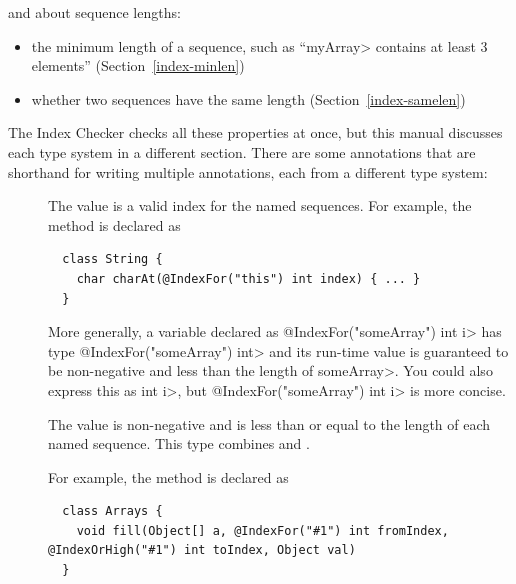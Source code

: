 \noindent
and about sequence lengths:
\begin{itemize}
\item
  the minimum length of a sequence, such as ``\<myArray> contains at least 3
  elements'' (Section~\ref{index-minlen})
\item
  whether two sequences have the same length (Section~\ref{index-samelen})
\end{itemize}

The Index Checker checks all these properties at once, but
this manual discusses each type system in a different section.
There are some annotations that are shorthand for writing multiple
annotations, each from a different type system:

\begin{description}
\item[]
  The value is a valid index for the named sequences.  For example, the
  method is declared as

  \begin{Verbatim}
  class String {
    char charAt(@IndexFor("this") int index) { ... }
  }
  \end{Verbatim}

  More generally, a variable
  declared as \<@IndexFor("someArray") int i> has type
  \<@IndexFor("someArray") int> and its run-time value is guaranteed to be
  non-negative and less than the length of \<someArray>.  You could also
  express this as
  \<
  int i>,
  but \<@IndexFor("someArray") int i> is more concise.

 \item[]
   The value is non-negative and is less than or equal to the length of
   each named sequence.  This type combines
   and
  .

  For example, the
   method is declared as

  \begin{mysmall}
  \begin{Verbatim}
  class Arrays {
    void fill(Object[] a, @IndexFor("#1") int fromIndex, @IndexOrHigh("#1") int toIndex, Object val)
  }
  \end{Verbatim}
  \end{mysmall}


\end{description}
